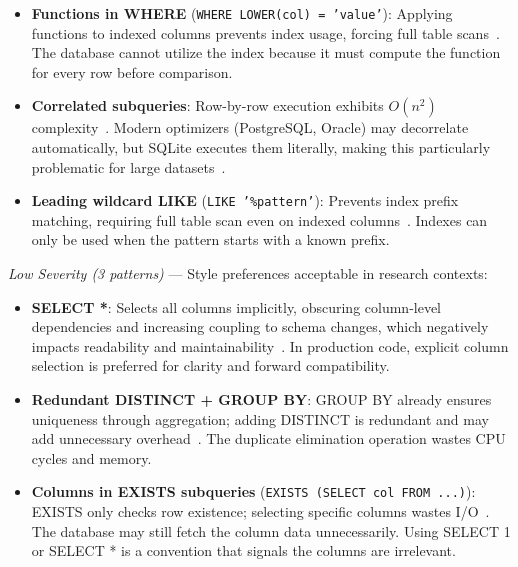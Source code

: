 \documentclass[print]{einformatica}
\begin{document}
\begin{itemize}
\item \textbf{Functions in WHERE} (\texttt{WHERE LOWER(col) = 'value'}): Applying functions to indexed columns prevents index usage, forcing full table scans~\cite{karwin2010sqlantipatterns,molinaro2020sqlcookbook,ramakrishnan2003dbms}. The database cannot utilize the index because it must compute the function for every row before comparison.

\item \textbf{Correlated subqueries}: Row-by-row execution exhibits $O(n^2)$ complexity~\cite{karwin2010sqlantipatterns,molinaro2020sqlcookbook,ramakrishnan2003dbms}. Modern optimizers (PostgreSQL, Oracle) may decorrelate automatically, but SQLite executes them literally, making this particularly problematic for large datasets~\cite{sqliteBareColumns}.

\item \textbf{Leading wildcard LIKE} (\texttt{LIKE '\%pattern'}): Prevents index prefix matching, requiring full table scan even on indexed columns~\cite{karwin2010sqlantipatterns,molinaro2020sqlcookbook,ramakrishnan2003dbms}. Indexes can only be used when the pattern starts with a known prefix.
\end{itemize}

\textit{Low Severity (3 patterns)} --- Style preferences acceptable in research contexts:

\begin{itemize}
\item \textbf{SELECT *}: Selects all columns implicitly, obscuring column-level dependencies and increasing coupling to schema changes, which negatively impacts readability and maintainability~\cite{karwin2010sqlantipatterns,molinaro2020sqlcookbook}. In production code, explicit column selection is preferred for clarity and forward compatibility.

\item \textbf{Redundant DISTINCT + GROUP BY}: GROUP BY already ensures uniqueness through aggregation; adding DISTINCT is redundant and may add unnecessary overhead~\cite{karwin2010sqlantipatterns,molinaro2020sqlcookbook}. The duplicate elimination operation wastes CPU cycles and memory.

\item \textbf{Columns in EXISTS subqueries} (\texttt{EXISTS (SELECT col FROM ...)}): EXISTS only checks row existence; selecting specific columns wastes I/O~\cite{karwin2010sqlantipatterns,molinaro2020sqlcookbook}. The database may still fetch the column data unnecessarily. Using SELECT 1 or SELECT * is a convention that signals the columns are irrelevant.
\end{itemize}
\end{document}
